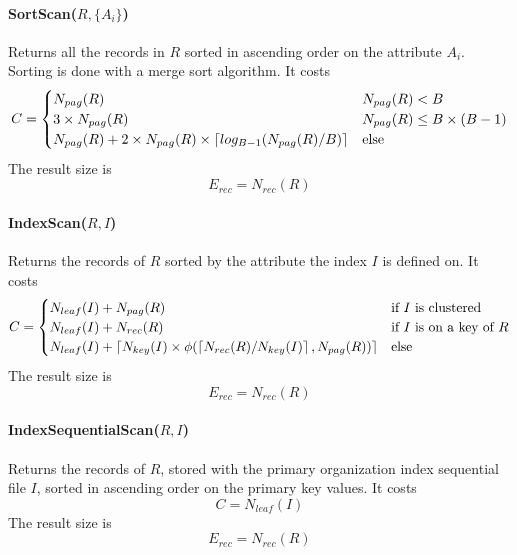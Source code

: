\paragraph{SortScan($R, \{A_i\}$)}
Returns all the records in $R$ sorted in ascending order on the attribute $A_i$. Sorting is done with a merge sort algorithm. It costs
\begin{equation*}
    C = \begin{cases}
        N_{pag}(R) & N_{pag}(R) < B \\
        3 \times N_{pag}(R) & N_{pag}(R) \leq B \times (B-1) \\
        N_{pag}(R) + 2 \times N_{pag}(R) \times \left\lceil log_{B-1}(N_{pag}(R) / B)\right\rceil & \text{else}
    \end{cases}
\end{equation*}
The result size is
\begin{equation*}
    E_{rec} = N_{rec}(R)
\end{equation*}

\paragraph{IndexScan($R, I$)}
Returns the records of $R$ sorted by the attribute the index $I$ is defined on. It costs
\begin{equation*}
    C = \begin{cases}
        N_{leaf}(I) + N_{pag}(R) & \text{if $I$ is clustered} \\
        N_{leaf}(I) + N_{rec}(R) & \text{if $I$ is on a key of $R$} \\
        N_{leaf}(I) + \left\lceil N_{key}(I) \times \phi(\left\lceil N_{rec}(R) / N_{key}(I)\right\rceil, N_{pag}(R))\right\rceil & \text{else}
    \end{cases}
\end{equation*}
The result size is
\begin{equation*}
    E_{rec} = N_{rec}(R)
\end{equation*}

\paragraph{IndexSequentialScan($R, I$)}
Returns the records of $R$, stored with the primary organization index sequential file $I$, sorted in ascending order on the primary key values. It costs
\begin{equation}
    C = N_{leaf}(I)
\end{equation}
The result size is
\begin{equation*}
    E_{rec} = N_{rec}(R)
\end{equation*}

